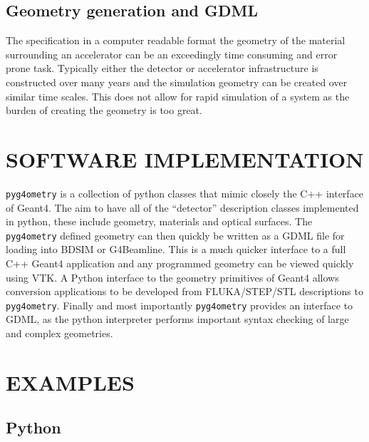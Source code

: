 \documentclass[a4paper,
               keeplastbox,   %
               ]{jacow}
\begin{document}
\subsection{Geometry generation and GDML}
The specification in a computer readable format the geometry of the material surrounding an accelerator can be an exceedingly time consuming and error prone task. Typically either the detector or accelerator infrastructure is constructed over many years and the simulation geometry can be created over similar time scales. This does not allow for rapid simulation of a system as the burden of creating the geometry is too great.

\section{SOFTWARE IMPLEMENTATION}
\verb|pyg4ometry| is a collection of python classes that mimic closely the C++ interface of Geant4. The aim to have all of the ``detector'' description classes implemented in python, these include geometry, materials and optical surfaces. The \verb|pyg4ometry| defined geometry can then quickly be written as a GDML file for loading into BDSIM or G4Beamline. This is a much quicker interface to a full C++ Geant4 application and any programmed geometry can be viewed quickly using VTK. A Python interface to the geometry primitives of Geant4 allows conversion applications to be developed from FLUKA/STEP/STL descriptions to \verb|pyg4ometry|. Finally and most importantly \verb|pyg4ometry| provides an interface to GDML, as the python interpreter performs important syntax checking of large and complex geometries. 

\section{EXAMPLES}
\subsection{Python}

\end{document}
